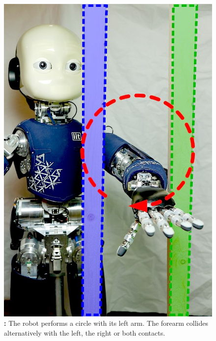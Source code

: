 	\begin{figure}[t]
		\begin{minipage}{.42\linewidth}
			\centering
			\includegraphics[width =.99\linewidth]{fig/iCubParis02_Double_Contact}
			\caption{\textbf{:} The robot performs a circle with its left arm. 
			The forearm collides alternatively with the left, the right or both contacts.}
			\label{fig:exp3:icuparis_experiment_bars}
		\end{minipage}	
		\hfill
		\begin{minipage}{.52\linewidth}
			\centering

\end{minipage}
\end{figure}
